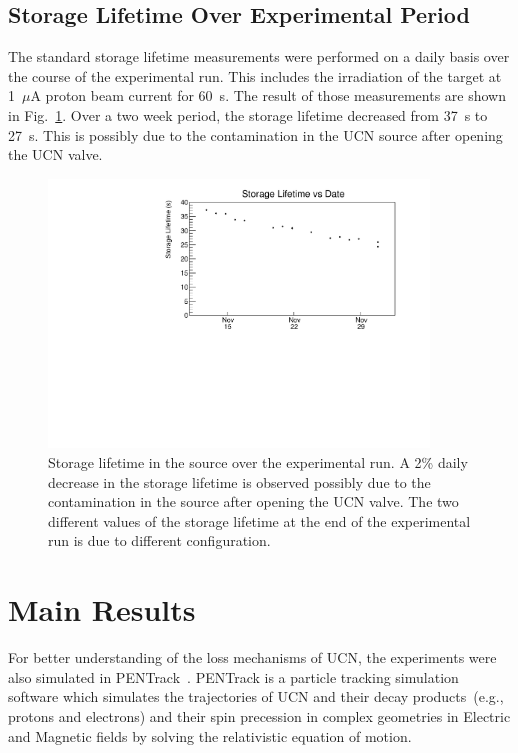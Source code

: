 \subsection{Storage Lifetime Over Experimental Period\label{sec:storage_overall}}

The standard storage lifetime measurements were performed on a daily
basis over the course of the experimental run. This includes the
irradiation of the target at 1~$\mu$A proton beam current for
60~s. The result of those measurements are shown in
Fig.~\ref{fig:storagelifetime_overall}. Over a two week period, the
storage lifetime decreased from 37~s to 27~s. This is possibly due to
the contamination in the UCN source after opening the UCN valve.


\begin{figure}[h!]
  \centering
  \includegraphics[width=0.9\textwidth]{storageLifetime_vs_time.pdf}
  \caption[Storage lifetime in the source over the experimental
  run]{Storage lifetime in the source over the experimental run. A 2\%
    daily decrease in the storage lifetime is observed possibly due to
    the contamination in the source after opening the UCN valve. The
    two different values of the storage lifetime at the end of the
    experimental run is due to different configuration.}
  \label{fig:storagelifetime_overall}
\end{figure}



\section{Main Results\label{sec:pentrack}}

For better understanding of the loss mechanisms of UCN, the
experiments were also simulated in
PENTrack~\cite{schreyer2017pentrack}. PENTrack is a particle tracking
simulation software which simulates the trajectories of UCN and their
decay products~(e.g., protons and electrons) and their spin precession
in complex geometries in Electric and Magnetic fields by solving the
relativistic equation of motion.

